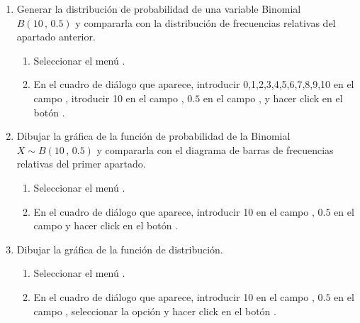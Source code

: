 \begin{enumerate}[leftmargin=*]
\begin{enumerate}
\item Generar la distribución de probabilidad de una variable Binomial $B(10\,,\,0.5)$ y compararla con la distribución de frecuencias relativas del apartado anterior.
\begin{indicacion}
\begin{enumerate}
\item Seleccionar el menú .
\item En el cuadro de diálogo que aparece, introducir 0,1,2,3,4,5,6,7,8,9,10 en el campo ,
itroducir 10 en el campo , $0.5$ en el campo , y hacer click
en el botón .
\end{enumerate}
\end{indicacion}

\item Dibujar la gráfica de la función de probabilidad de la Binomial $X\sim B(10\,,\,0.5)$ y compararla con el
diagrama de barras de frecuencias relativas del primer apartado.
\begin{indicacion}
\begin{enumerate}
\item Seleccionar el menú .
\item En el cuadro de diálogo que aparece, introducir 10 en el campo ,
$0.5$ en el campo  y hacer click en el botón .
\end{enumerate}
\end{indicacion}

\item Dibujar la gráfica de la función de distribución.
\begin{indicacion}
\begin{enumerate}
\item Seleccionar el menú .
\item En el cuadro de diálogo que aparece, introducir 10 en el campo , $0.5$ en el campo
, seleccionar la opción  y hacer click en el botón
.
\end{enumerate}
\end{indicacion}


\end{enumerate}
\end{enumerate}
